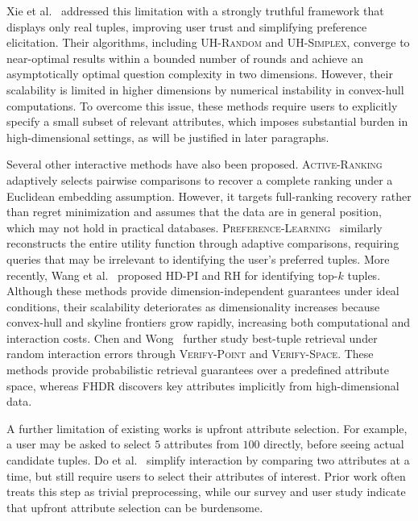 \documentclass[conference]{IEEEtran}
\theoremstyle{definition}
\theoremstyle{plain}
\begin{document}
Xie et al.~\cite{XCL19} addressed this limitation with a strongly truthful framework that displays only real tuples, improving user trust and simplifying preference elicitation. Their algorithms, including \textsc{UH-Random} and \textsc{UH-Simplex}, converge to near-optimal results within a bounded number of rounds and achieve an asymptotically optimal question complexity in two dimensions. However, their scalability is limited in higher dimensions by numerical instability in convex-hull computations. To overcome this issue, these methods require users to explicitly specify a small subset of relevant attributes, which imposes substantial burden in high-dimensional settings, as will be justified in later paragraphs.

Several other interactive methods have also been proposed. \textsc{Active-Ranking}~\cite{jamieson2011active} adaptively selects pairwise comparisons to recover a complete ranking under a Euclidean embedding assumption. However, it targets full-ranking recovery rather than regret minimization and assumes that the data are in general position, which may not hold in practical databases. \textsc{Preference-Learning}~\cite{qian2015learning} similarly reconstructs the entire utility function through adaptive comparisons, requiring queries that may be irrelevant to identifying the user’s preferred tuples. More recently, Wang et al.~\cite{WWX21} proposed \textsc{HD-PI} and \textsc{RH} for identifying top-$k$ tuples. Although these methods provide dimension-independent guarantees under ideal conditions, their scalability deteriorates as dimensionality increases because convex-hull and skyline frontiers grow rapidly, increasing both computational and interaction costs. Chen and Wong~\cite{CW23} further study best-tuple retrieval under random interaction errors through \textsc{Verify-Point} and \textsc{Verify-Space}. These methods provide probabilistic retrieval guarantees over a predefined attribute space, whereas FHDR discovers key attributes implicitly from high-dimensional data.

A further limitation of existing works is upfront attribute selection. For example, a user may be asked to select $5$ attributes from $100$ directly, before seeing actual candidate tuples. Do et al.~\cite{LA25} simplify interaction by comparing two attributes at a time, but still require users to select their attributes of interest. Prior work often treats this step as trivial preprocessing, while our survey and user study indicate that upfront attribute selection can be burdensome.
\end{document}
